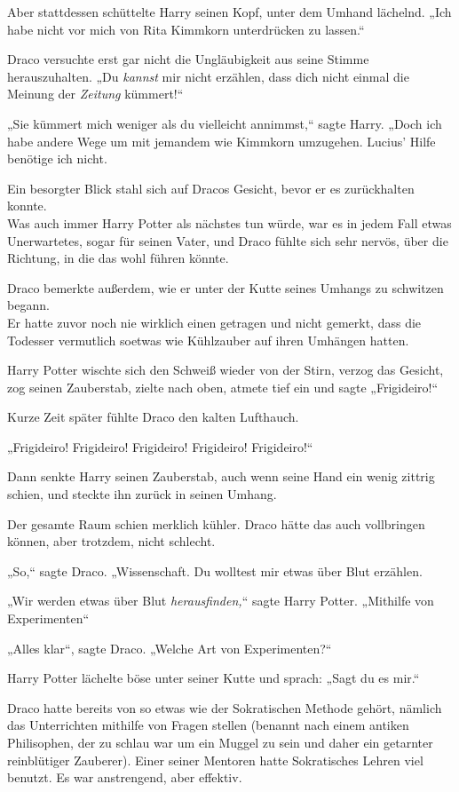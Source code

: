 {Aber stattdessen schüttelte Harry seinen Kopf, unter dem Umhand lächelnd. „Ich habe nicht vor mich von Rita Kimmkorn unterdrücken zu lassen.“

Draco versuchte erst gar nicht die Ungläubigkeit aus seine Stimme herauszuhalten. „Du \emph{kannst} mir nicht erzählen, dass dich nicht einmal die Meinung der \emph{Zeitung} kümmert!“

„Sie kümmert mich weniger als du vielleicht annimmst,“ sagte Harry. „Doch ich habe andere Wege um mit jemandem wie Kimmkorn umzugehen. Lucius' Hilfe benötige ich nicht.

Ein besorgter Blick stahl sich auf Dracos Gesicht, bevor er es zurückhalten konnte.\\ Was auch immer Harry Potter als nächstes tun würde, war es in jedem Fall etwas Unerwartetes, sogar für seinen Vater, und Draco fühlte sich sehr nervös, über die Richtung, in die das wohl führen könnte.

Draco bemerkte außerdem, wie er unter der Kutte seines Umhangs zu schwitzen begann.\\ Er hatte zuvor noch nie wirklich einen getragen und nicht gemerkt, dass die Todesser vermutlich soetwas wie Kühlzauber auf ihren Umhängen hatten.

Harry Potter wischte sich den Schweiß wieder von der Stirn, verzog das Gesicht, zog seinen Zauberstab, zielte nach oben, atmete tief ein und sagte „Frigideiro!“

Kurze Zeit später fühlte Draco den kalten Lufthauch.

„Frigideiro! Frigideiro! Frigideiro! Frigideiro! Frigideiro!“

Dann senkte Harry seinen Zauberstab, auch wenn seine Hand ein wenig zittrig schien, und steckte ihn zurück in seinen Umhang.

Der gesamte Raum schien merklich kühler. Draco hätte das auch vollbringen können, aber trotzdem, nicht schlecht.

„So,“ sagte Draco. „Wissenschaft. Du wolltest mir etwas über Blut erzählen.

„Wir werden etwas über Blut \emph{herausfinden,}“ sagte Harry Potter. „Mithilfe von Experimenten“

„Alles klar“, sagte Draco. „Welche Art von Experimenten?“

Harry Potter lächelte böse unter seiner Kutte und sprach: „Sagt du es mir.“

Draco hatte bereits von so etwas wie der Sokratischen Methode gehört, nämlich das Unterrichten mithilfe von Fragen stellen (benannt nach einem antiken Philisophen, der zu schlau war um ein Muggel zu sein und daher ein getarnter reinblütiger Zauberer). Einer seiner Mentoren hatte Sokratisches Lehren viel benutzt. Es war anstrengend, aber effektiv.

}
